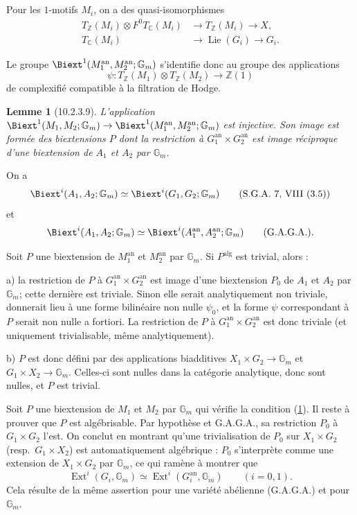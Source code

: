 \documentclass[12pt,a4paper]{amsart}
\theoremstyle{plain}
\newtheorem{lemme}{Lemme}[section]
\theoremstyle{definition}
\theoremstyle{remark}
\DeclareMathOperator{\Ext}{Ext}
\DeclareMathOperator{\Lie}{Lie}
\numberwithin{equation}{section}
\begin{document}
\subsection{}\label{10.2.3.8}
Pour les $1$-motifs $M_i$, on a des quasi-isomorphismes
\begin{align*}
T_\mathbb{Z}(M_i)\otimes F^0T_\mathbb{C}(M_i) &\longrightarrow T_\mathbb{Z}(M_i) \longrightarrow X, \\
T_\mathbb{C}(M_i) &\longrightarrow \Lie(G_i) \longrightarrow G_i.
\end{align*}

Le groupe $\Biext^1(M_1^\mathrm{an},M_2^\mathrm{an};\mathbb{G}_m)$ s'identifie donc au groupe des applications
\[
\psi:T_\mathbb{Z}(M_1)\otimes T_\mathbb{Z}(M_2)\to\mathbb{Z}(1)
\]
de complexifié compatible à la filtration de Hodge.

\begin{lemme}[10.2.3.9]\label{lemme:10.2.3.9}
L'application $\Biext^1(M_1,M_2;\mathbb{G}_m)\to\Biext^1(M_1^\mathrm{an},M_2^\mathrm{an};\mathbb{G}_m)$ est injective. Son image est formée des biextensions $P$ dont la restriction à $G_1^\mathrm{an}\times G_2^\mathrm{an}$ est image réciproque d'une biextension de $A_1$ et $A_2$ par $\mathbb{G}_m$.
\end{lemme}

On a
\[
\Biext^i(A_1,A_2;\mathbb{G}_m)\simeq\Biext^i(G_1,G_2;\mathbb{G}_m) \qquad\text{(S.G.A.~7, VIII~(3.5))}
\]
et
\[
\Biext^i(A_1,A_2;\mathbb{G}_m)\simeq\Biext^i(A_1^\mathrm{an},A_2^\mathrm{an};\mathbb{G}_m) \qquad\text{(G.A.G.A.)}.
\]

Soit $P$ une biextension de $M_1^\mathrm{an}$ et $M_2^\mathrm{an}$ par $\mathbb{G}_m$. Si $P^\mathrm{alg}$ est trivial, alors :

a) la restriction de $P$ à $G_1^\mathrm{an}\times G_2^\mathrm{an}$ est image d'une biextension $P_0$ de $A_1$ et $A_2$ par $\mathbb{G}_m$; cette dernière est triviale. Sinon elle serait analytiquement non triviale, donnerait lieu à une forme bilinéaire non nulle $\psi_0$, et la forme $\psi$ correspondant à $P$ serait non nulle a fortiori. La restriction de $P$ à $G_1^\mathrm{an}\times G_2^\mathrm{an}$ est donc triviale (et uniquement trivialisable, même analytiquement).

b) $P$ est donc défini par des applications biadditives $X_1\times G_2\to\mathbb{G}_m$ et $G_1\times X_2\to\mathbb{G}_m$. Celles-ci sont nulles dans la catégorie analytique, donc sont nulles, et $P$ est trivial.

Soit $P$ une biextension de $M_1$ et $M_2$ par $\mathbb{G}_m$ qui vérifie la condition (\ref{lemme:10.2.3.9}). Il reste à prouver que $P$ est algébrisable. Par hypothèse et G.A.G.A., sa restriction $P_0$ à $G_1\times G_2$ l'est. On conclut en montrant qu'une trivialisation de $P_0$ sur $X_1\times G_2$ (resp.~$G_1\times X_2$) est automatiquement algébrique : $P_0$ s'interprète comme une extension de $X_1\times G_2$ par $\mathbb{G}_m$, ce qui ramène à montrer que
\[
\Ext^i(G_i,\mathbb{G}_m)\simeq\Ext^i(G_i^\mathrm{an},\mathbb{G}_m) \qquad (i=0,1).
\]
Cela résulte de la même assertion pour une variété abélienne (G.A.G.A.) et pour $\mathbb{G}_m$.
\end{document}
